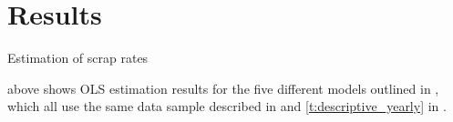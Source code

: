 \section{Results}
\label{s:results}
\begin{table}
    \centering
    \caption{Estimation of scrap rates}
    \label{t:results}
    
\end{table}
 above shows OLS estimation results for the five different models outlined in , which all use the same data sample described in  and \ref{t:descriptive_yearly} in .